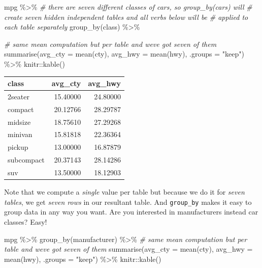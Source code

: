 \documentclass[
]{book}
\newenvironment{Shaded}{\begin{snugshade}}{\end{snugshade}}
\newcommand{\AttributeTok}[1]{\textcolor[rgb]{0.77,0.63,0.00}{#1}}
\newcommand{\CommentTok}[1]{\textcolor[rgb]{0.56,0.35,0.01}{\textit{#1}}}
\newcommand{\FunctionTok}[1]{\textcolor[rgb]{0.00,0.00,0.00}{#1}}
\newcommand{\NormalTok}[1]{#1}
\newcommand{\SpecialCharTok}[1]{\textcolor[rgb]{0.00,0.00,0.00}{#1}}
\newcommand{\StringTok}[1]{\textcolor[rgb]{0.31,0.60,0.02}{#1}}
\begin{document}
\begin{Shaded}
\begin{Highlighting}[]
\NormalTok{mpg }\SpecialCharTok{\%\textgreater{}\%}
  \CommentTok{\# there are seven different classes of cars, so group\_by(cars)  will}
  \CommentTok{\# create seven hidden independent tables and all verbs below will be }
  \CommentTok{\# applied to each table separately}
  \FunctionTok{group\_by}\NormalTok{(class)  }\SpecialCharTok{\%\textgreater{}\%}
  
  \CommentTok{\# same mean computation but per table and we\textquotesingle{}ve got seven of them}
  \FunctionTok{summarise}\NormalTok{(}\AttributeTok{avg\_cty =} \FunctionTok{mean}\NormalTok{(cty),}
            \AttributeTok{avg\_hwy =} \FunctionTok{mean}\NormalTok{(hwy),}
            \AttributeTok{.groups =} \StringTok{"keep"}\NormalTok{) }\SpecialCharTok{\%\textgreater{}\%}
\NormalTok{  knitr}\SpecialCharTok{::}\FunctionTok{kable}\NormalTok{()}
\end{Highlighting}
\end{Shaded}

\begin{tabular}{l|r|r}
\hline
class & avg\_cty & avg\_hwy\\
\hline
2seater & 15.40000 & 24.80000\\
\hline
compact & 20.12766 & 28.29787\\
\hline
midsize & 18.75610 & 27.29268\\
\hline
minivan & 15.81818 & 22.36364\\
\hline
pickup & 13.00000 & 16.87879\\
\hline
subcompact & 20.37143 & 28.14286\\
\hline
suv & 13.50000 & 18.12903\\
\hline
\end{tabular}

Note that we compute a \emph{single} value per table but because we do it for \emph{seven tables}, we get \emph{seven rows} in our resultant table. And \texttt{group\_by} makes it easy to group data in any way you want. Are you interested in manufacturers instead car classes? Easy!

\begin{Shaded}
\begin{Highlighting}[]
\NormalTok{mpg }\SpecialCharTok{\%\textgreater{}\%}
  \FunctionTok{group\_by}\NormalTok{(manufacturer)  }\SpecialCharTok{\%\textgreater{}\%}
  \CommentTok{\# same mean computation but per table and we\textquotesingle{}ve got seven of them}
  \FunctionTok{summarise}\NormalTok{(}\AttributeTok{avg\_cty =} \FunctionTok{mean}\NormalTok{(cty),}
            \AttributeTok{avg\_hwy =} \FunctionTok{mean}\NormalTok{(hwy), }\AttributeTok{.groups =} \StringTok{"keep"}\NormalTok{) }\SpecialCharTok{\%\textgreater{}\%}
\NormalTok{  knitr}\SpecialCharTok{::}\FunctionTok{kable}\NormalTok{()}
\end{Highlighting}
\end{Shaded}
\end{document}
